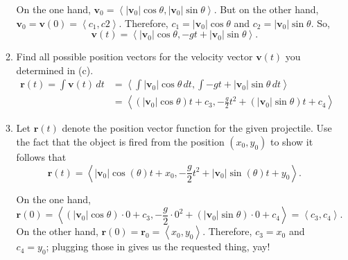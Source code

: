 \documentclass[10pt]{article}
\newcommand{\vv}{\mathbf{v}}
\newcommand{\vr}{\mathbf{r}}
\newenvironment{red}{\color{red}}{\ignorespacesafterend}
\begin{document}
\begin{enumerate}[leftmargin=0pt]
\begin{enumerate}
    \begin{red}
        On the one hand, $\vv_0 = \left\langle |\vv_0|\cos\theta, |\vv_0|\sin\theta \right\rangle$. But on the other hand, $\vv_0 = \vv(0) = \left\langle c_1, c2 \right\rangle$. 
        Therefore, $c_1 = |\vv_0|\cos\theta$ and $c_2 = |\vv_0|\sin\theta$. So,
        \[\vv(t) = \left\langle |\vv_0|\cos\theta, -gt + |\vv_0|\sin\theta \right\rangle.\]
    \end{red}
    \item Find all possible position vectors for the velocity vector $\vv(t)$ you determined in (c).
    \begin{red}
        \begin{align*}
            \vr(t) = \int \vv(t)\, dt &= \left\langle \int |\vv_0|\cos\theta\, dt, \int -gt + |\vv_0|\sin\theta\,dt \right\rangle \\
            &= \left\langle
                (|\vv_0|\cos\theta)t + c_3, 
                -\frac{g}{2} t^2 + (|\vv_0|\sin\theta )t + c_4
            \right\rangle
        \end{align*}
    \end{red}
    \item Let $\vr(t)$ denote the position vector function for the given projectile. Use the fact that the object is fired from the position $(x_0, y_0)$ to show it follows that
    \begin{equation*}
        \vr(t) = \left\langle |\vv_0| \cos(\theta)t + x_0, -\frac{g}{2}t^2 + |\vv_0| \sin(\theta)t + y_0 \right\rangle.
    \end{equation*}
    
    \begin{red}
        On the one hand, 
        \[\vr(0) = \left\langle
            (|\vv_0|\cos\theta)\cdot 0 + c_3, 
            -\frac{g}{2}\cdot  0^2 + (|\vv_0|\sin\theta )\cdot 0 + c_4
        \right\rangle = \left\langle c_3, c_4\right\rangle.\]
        On the other hand, $\vr(0) = \vr_0 = \left\langle x_0, y_0 \right\rangle$. 
        Therefore, $c_3 = x_0$ and $c_4 = y_0$; plugging those in gives us the requested thing, yay!
    \end{red}
\end{enumerate}

\end{enumerate}
	
\end{document}
